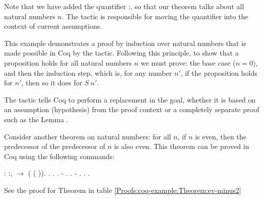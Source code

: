 Note that we have added the quantifier \coqdockw{\ensuremath{\forall}} :, so that our theorem talks about all natural numbers $ n $. The tactic  is responsible for moving the quantifier into the context of current assumptions.

This example demonstrates a proof by induction over natural numbers that is made possible in Coq by the  tactic. Following this principle, to show that a proposition holds for all natural numbers $ n $ we must prove: the base case ($ n = 0 $), and then the induction step, which is, for any number $ n' $, if the proposition holds for $ n' $, then so it does for $ S \ n' $.

The tactic  tells Coq to perform a replacement in the goal, whether it is based on an assumption (hypothesis) from the proof context or a completely separate proof such as the Lemma . 

Consider another theorem on natural numbers: for all $ n $, if $ n $ is even, then the predecessor of the predecessor of $ n $ is also even. This theorem can be proved in Coq using the following commands:

\begin{coqdoccode}
	\coqdocnoindent
	  : \coqdockw{\ensuremath{\forall}} :,\coqdoceol
	\coqdocindent{1.00em}
	  \ensuremath{\rightarrow}  ( ( )).\coqdoceol
	\coqdocnoindent
	.\coqdoceol
	\coqdocindent{1.00em}
	.\coqdoceol
	\coqdocindent{1.00em}
	 .\coqdoceol
	\coqdocindent{1.00em}
	- .  .\coqdoceol
	\coqdocindent{1.00em}
	- .  .\coqdoceol
	\coqdocnoindent
	.\coqdoceol
\end{coqdoccode}

\noindent See the proof for Theorem  in table \ref{Proofs:coq-example:Theorem:ev-minus2}

